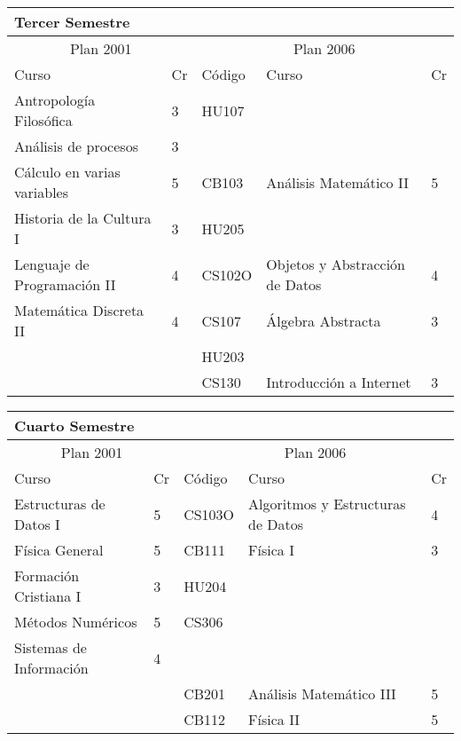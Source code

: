 \begin{center}
\begin{tabularx}{0.95\textwidth}{|p{4cm}|p{1cm}||p{2cm}|X|p{1cm}|}\hline
\multicolumn{5}{|l|}{\textbf{Tercer Semestre}} \\ \hline
\multicolumn{2}{|c|}{Plan 2001} & \multicolumn{3}{|c|}{Plan 2006} \\ \hline
Curso & Cr & Código & Curso & Cr \\ \hline
Antropología Filosófica & 3 & HU107 &  & \\ \hline
Análisis de procesos & 3 &  &  & \\ \hline
Cálculo en varias variables & 5 & CB103 & Análisis Matemático II & 5 \\ \hline
Historia de la Cultura I & 3 & HU205 &  & \\ \hline
Lenguaje de Programación II & 4 & CS102O & Objetos y Abstracción de Datos & 4 \\ \hline
Matemática Discreta II & 4 & CS107 & Álgebra Abstracta & 3 \\ \hline
 &  & HU203 &  & \\ \hline
 &  & CS130 & Introducción a Internet & 3 \\ \hline
\end{tabularx}
\end{center}

\begin{center}
\begin{tabularx}{0.95\textwidth}{|p{4cm}|p{1cm}||p{2cm}|X|p{1cm}|}\hline
\multicolumn{5}{|l|}{\textbf{Cuarto Semestre}} \\ \hline
\multicolumn{2}{|c|}{Plan 2001} & \multicolumn{3}{|c|}{Plan 2006} \\ \hline
Curso & Cr & Código & Curso & Cr \\ \hline
Estructuras de Datos I & 5 & CS103O & Algoritmos y Estructuras de Datos & 4 \\ \hline
Física General & 5 & CB111 & Física I & 3 \\ \hline
Formación Cristiana I & 3 & HU204 &  & \\ \hline
Métodos Numéricos & 5 & CS306 &  & \\ \hline
Sistemas de Información & 4 &  &  & \\ \hline
 &  & CB201 & Análisis Matemático III & 5 \\ \hline
 &  & CB112 & Física II & 5 \\ \hline
\end{tabularx}
\end{center}

